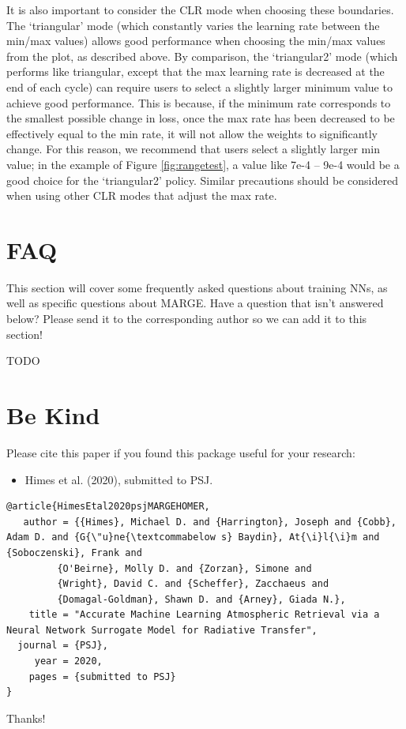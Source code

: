 \documentclass[letterpaper, 12pt]{article}
\begin{document}
\noindent It is also important to consider the CLR mode when choosing these 
boundaries.  The `triangular' mode (which constantly varies the 
learning rate between the min/max values) allows good performance when choosing 
the min/max values from the plot, as described above.  By comparison, the 
`triangular2' mode (which performs like triangular, except that the max 
learning rate is decreased at the end of each cycle) can require users to 
select a slightly larger minimum value to achieve good performance.  This is 
because, if the minimum rate corresponds to the smallest possible change in 
loss, once the max rate has been decreased to be effectively equal to the min 
rate, it will not allow the weights to significantly change.  For this reason, 
we recommend that users select a slightly larger min value; in the example of 
Figure \ref{fig:rangetest}, a value like 7e-4 -- 9e-4 would be a good choice 
for the `triangular2' policy.  Similar precautions should be considered when 
using other CLR modes that adjust the max rate.


\section{FAQ}

This section will cover some frequently asked questions about training NNs, 
as well as specific questions about MARGE.  Have a question that isn't 
answered below?  Please send it to the corresponding author so we can add 
it to this section! \newline

\noindent TODO


\section{Be Kind}
\label{sec:bekind}
Please cite this paper if you found this package useful for your research:

\begin{itemize}
\item Himes et al. (2020), submitted to PSJ.
\end{itemize}

\begin{verbatim}
@article{HimesEtal2020psjMARGEHOMER,
   author = {{Himes}, Michael D. and {Harrington}, Joseph and {Cobb}, Adam D. and {G{\"u}ne{\textcommabelow s} Baydin}, At{\i}l{\i}m and {Soboczenski}, Frank and
         {O'Beirne}, Molly D. and {Zorzan}, Simone and
         {Wright}, David C. and {Scheffer}, Zacchaeus and
         {Domagal-Goldman}, Shawn D. and {Arney}, Giada N.},
    title = "Accurate Machine Learning Atmospheric Retrieval via a Neural Network Surrogate Model for Radiative Transfer",
  journal = {PSJ},
     year = 2020,
    pages = {submitted to PSJ}
}
\end{verbatim}

\noindent Thanks!


\end{document}
